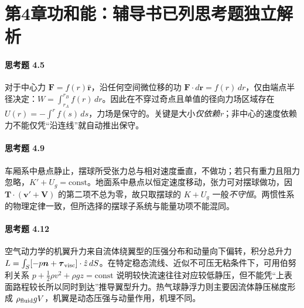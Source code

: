 \section*{第4章\quad 功和能：辅导书已列思考题独立解析}
\paragraph{思考题 4.5}
对于中心力 \(\boldsymbol F=f(r)\hat{\boldsymbol r}\)，沿任何空间微位移的功 \(\boldsymbol F\cdot d\boldsymbol r=f(r)\,dr\)，仅由端点半径决定：\(W=\int_{r_A}^{r_B}f(r)\,dr\)。因此在不穿过奇点且单值的径向力场区域存在 \(\boxed{U(r)=-\int^r f(s)\,ds}\)，力场是保守的。关键是大小\emph{仅依赖r}；非中心的速度依赖力不能仅凭“沿连线”就自动推出保守。

\paragraph{思考题 4.9}
车厢系中悬点静止，摆球所受张力总与相对速度垂直，不做功；若只有重力且阻力忽略，\(\boxed{K'+U_g=\mathrm{const}}\)。地面系中悬点以恒定速度移动，张力可对摆球做功，因 \(\boldsymbol T\cdot(\boldsymbol v'+\boldsymbol V)\) 的第二项不总为零，故只取摆球的 \(K+U_g\) 一般\emph{不守恒}。两惯性系的物理定律一致，但所选择的摆球子系统与能量功项不能混同。

\paragraph{思考题 4.12}
空气动力学的机翼升力来自流体绕翼型的压强分布和动量向下偏转，积分总升力 \(L=\int_S[-p\boldsymbol n+\boldsymbol\tau_{\rm visc}]\cdot\hat z\,dS\)。在特定稳态流线、近似不可压无粘条件下，可用伯努利关系 \(p+\frac12\rho v^2+\rho gz=\mathrm{const}\) 说明较快流速往往对应较低静压，但不能凭“上表面路程较长所以同时到达”推导翼型升力。热气球静浮力则主要因流体静压梯度形成 \(\rho_{\rm fluid}gV\)，机翼是动态压强与动量作用，机理不同。
